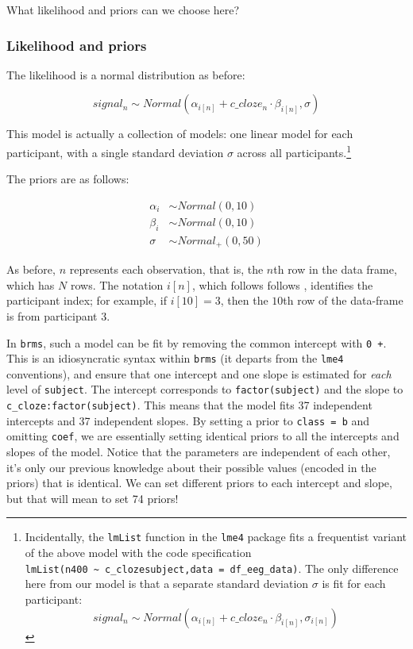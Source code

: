 \documentclass[12pt,]{krantz}
\theoremstyle{definition}
\theoremstyle{definition}
\theoremstyle{definition}
\theoremstyle{remark}
\begin{document}
What likelihood and priors can we choose here?

\hypertarget{likelihood-and-priors-2}{%
\subsubsection{Likelihood and priors}\label{likelihood-and-priors-2}}

The likelihood is a normal distribution as before:

\begin{equation}
 signal_n \sim Normal( \alpha_{i[n]} + c\_cloze_n \cdot \beta_{i[n]},\sigma)
 \end{equation}

This model is actually a collection of models: one linear model for each participant, with a single standard deviation \(\sigma\) across all participants.\footnote{Incidentally, the \texttt{lmList} function in the \texttt{lme4} package fits a frequentist variant of the above model with the code specification \texttt{lmList(n400\ \textasciitilde{}\ c\_cloze\textbar{}subject,data\ =\ df\_eeg\_data)}. The only difference here from our model is that a separate standard deviation \(\sigma\) is fit for each participant:
  \begin{equation}
   signal_n \sim Normal( \alpha_{i[n]} + c\_cloze_n \cdot \beta_{i[n]},\sigma_{i[n]})
   \end{equation}}

The priors are as follows:

\begin{equation}
 \begin{aligned}
 \alpha_i &\sim Normal(0,10)\\
 \beta_i  &\sim Normal(0,10)\\
 \sigma  &\sim Normal_+(0,50)
 \end{aligned}
 \end{equation}

As before, \(n\) represents each observation, that is, the \(n\)th row in the data frame, which has \(N\) rows. The notation \(i[n]\), which follows follows \citet{GelmanHill2007}, identifies the participant index; for example, if \(i[10]=3\), then the \(10\)th row of the data-frame is from participant \(3\).

In \texttt{brms}, such a model can be fit by removing the common intercept with \texttt{0\ +}. This is an idiosyncratic syntax within \texttt{brms} (it departs from the \texttt{lme4} conventions), and ensure that one intercept and one slope is estimated for \emph{each} level of \texttt{subject}. The intercept corresponds to \texttt{factor(subject)} and the slope to \texttt{c\_cloze:factor(subject)}. This means that the model fits 37 independent intercepts and 37 independent slopes. By setting a prior to \texttt{class\ =\ b} and omitting \texttt{coef}, we are essentially setting identical priors to all the intercepts and slopes of the model. Notice that the parameters are independent of each other, it's only our previous knowledge about their possible values (encoded in the priors) that is identical. We can set different priors to each intercept and slope, but that will mean to set 74 priors!
\end{document}
